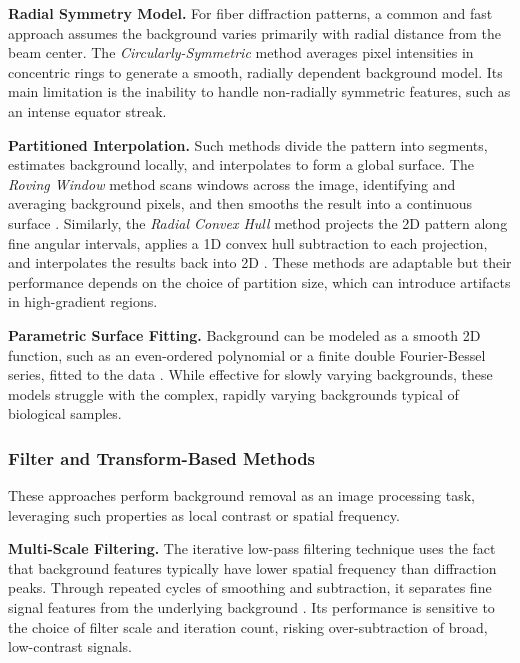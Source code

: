 \documentclass[iucr,review]{iucrjournals}
\begin{document}
        \textbf{Radial Symmetry Model.} For fiber diffraction patterns, a common and fast approach assumes the background
        varies primarily with radial distance from the beam center.
        The \emph{Circularly-Symmetric} method averages pixel intensities in concentric rings to generate a smooth,
        radially dependent background model. Its main limitation is the inability to handle non-radially symmetric features,
        such as an intense equator streak. \cite{FibreFixDiamond}

        \textbf{Partitioned Interpolation.}
        Such methods divide the pattern into segments, estimates background locally,
        and interpolates to form a global surface.
        The \emph{Roving Window} method scans windows across the image,
        identifying and averaging background pixels,
        and then smooths the result into a continuous surface \cite{LanganRowingWindow}. 
        Similarly, the \emph{Radial Convex Hull}
        method projects the 2D pattern along fine angular intervals,
        applies a 1D convex hull subtraction to each projection,
        and interpolates the results back into 2D \cite{MuscleXQuadrantFolding}.
        These methods are adaptable but
        their performance depends on the choice of
        partition size,
        which can introduce artifacts in high-gradient regions.

        \textbf{Parametric Surface Fitting.} Background can be modeled as a smooth 2D function,
        such as an even-ordered polynomial or a finite double Fourier-Bessel series, fitted to the data 
        \cite{LorenzHolmes1993, MillaneArnott1985, Makowski1978}.
        While effective for slowly varying backgrounds, these models struggle with the complex,
        rapidly varying backgrounds typical of biological samples.

    \subsubsection{Filter and Transform-Based Methods}
        These approaches perform background removal as an image processing task,
        leveraging such properties as local contrast or spatial frequency.

        \textbf{Multi-Scale Filtering.}
        The iterative low-pass filtering technique uses the fact that background features typically have
        lower spatial frequency than diffraction peaks.
        Through repeated cycles of smoothing and subtraction, it separates fine signal features from the underlying background \cite{IvanovaMakowski1998}.
        Its performance is sensitive to the choice of filter scale and iteration count, risking over-subtraction of broad,
        low-contrast signals.
\end{document}
